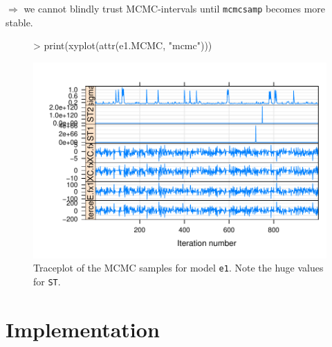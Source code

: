 \documentclass[12pt]{article}
\newenvironment{Schunk}{}{}
\newcommand{\code}[1]{\texttt{\small{#1}}}
\begin{document}
$\Rightarrow$ we cannot blindly trust MCMC-intervals until \code{mcmcsamp}
becomes more stable.
\begin{figure}[!htbp] \centering
\begin{Schunk}
\begin{Sinput}
> print(xyplot(attr(e1.MCMC, "mcmc")))
\end{Sinput}
\end{Schunk}
\includegraphics{GAMMsUsingLME4-ethanolMCMC}
\caption{Traceplot of the MCMC samples for model \code{e1}. Note the huge 
values for \code{ST}. \label{traceplot}}                    
\end{figure}  

\clearpage
\section{Implementation}
\end{document}
